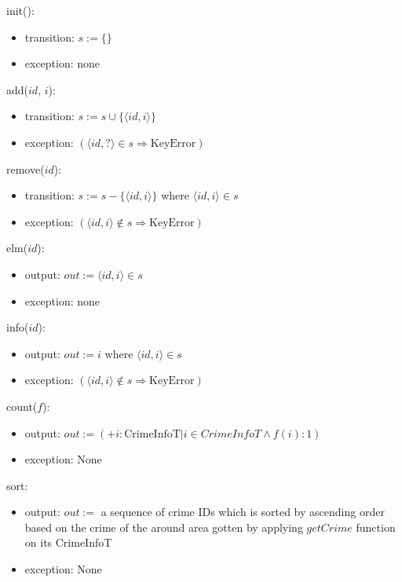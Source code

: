\documentclass[12pt]{article}
\begin{document}
\noindent init():
\begin{itemize}
\item transition: $s := \{ \}$
\item exception: none
\end{itemize}

\noindent add($id$, $i$):
\begin{itemize}
\item transition: $s := s \cup \{ \langle id, i \rangle \}$
\item exception: $(\langle id, ? \rangle \in s \Rightarrow \text{KeyError} )$
\end{itemize}

\noindent remove($id$):
\begin{itemize}
\item transition: $s := s - \{ \langle id, i \rangle \}$ where $\langle id, i
  \rangle \in s$
\item exception: $(\langle id, i \rangle \notin s \Rightarrow \text{KeyError} )$
\end{itemize}

\noindent elm($id$):
\begin{itemize}
\item output: $out := \langle id, i \rangle \in s$
\item exception: none
\end{itemize}

\noindent info($id$):
\begin{itemize}
\item output: $out := i$ where $\langle id, i \rangle \in s$
\item exception: $(\langle id, i \rangle \notin s \Rightarrow \text{KeyError} )$
\end{itemize}

\noindent count($f$):
\begin{itemize}
\item output: $out := (+ i: \text{CrimeInfoT} | i \in CrimeInfoT \wedge f(i) : 1)$
\item exception: None
 \end{itemize}
 
 \noindent sort:
\begin{itemize}
\item output: $out := $ a sequence of crime IDs which is sorted by ascending order based on the crime of the around area gotten by applying $getCrime$ function on its CrimeInfoT
\item exception: None

\end{itemize}
\end{document}
